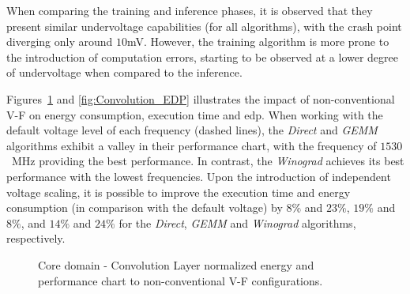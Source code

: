 When comparing the training and inference phases, it is observed that they present similar undervoltage capabilities (for all algorithms), with the crash point diverging only around $10$mV. However, the training algorithm is more prone to the introduction of computation errors, starting to be observed at a lower degree of undervoltage when compared to the inference.

Figures~\ref{fig:Convolution_behaviour} and \ref{fig:Convolution_EDP} illustrates the impact of non-conventional V-F on energy consumption, execution time and \acrshort{edp}. When working with the default voltage level of each frequency (dashed lines), the \textit{Direct} and \textit{GEMM} algorithms exhibit a valley in their performance chart, with the frequency of $1530$~MHz providing the best performance. In contrast, the \textit{Winograd} achieves its best performance with the lowest frequencies. Upon the introduction of independent voltage scaling, it is possible to improve the execution time and energy consumption (in comparison with the default voltage) by $8\%$ and $23\%$, $19\%$ and $8\%$, and $14\%$ and $24\%$ for the \textit{Direct}, \textit{GEMM} and \textit{Winograd} algorithms, respectively. 

\begin{figure}[htb]
  \begin{subfigmatrix}{2}
  \end{subfigmatrix}
  \caption{Core domain - Convolution Layer normalized energy and performance chart to non-conventional V-F configurations.}
  \label{fig:Convolution_behaviour}
\end{figure}

